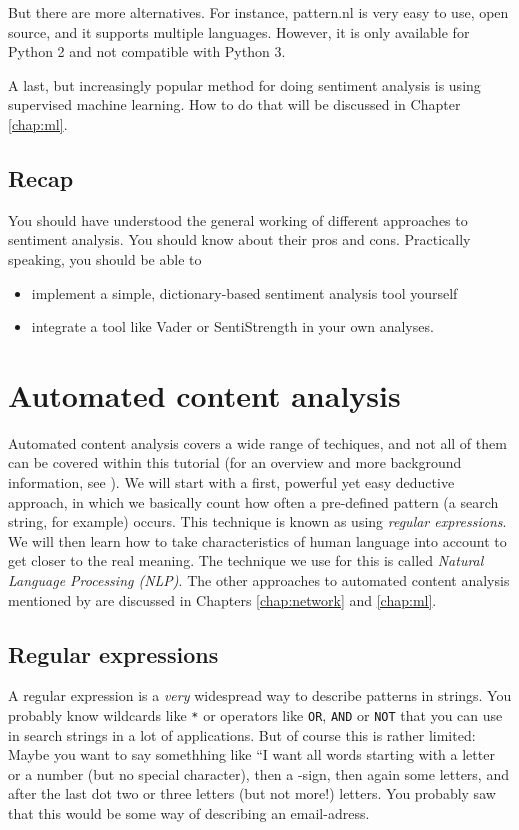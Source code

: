 \documentclass[a4paper,12pt]{book}
\begin{document}
But there are more alternatives. For instance, pattern.nl \citep{DeSmedt2012} is very easy to use, open source, and it supports multiple languages. However, it is only available for Python 2 and not compatible with Python 3.

A last, but increasingly popular method for doing sentiment analysis is using supervised machine learning. How to do that will be discussed in Chapter \ref{chap:ml}.


\section{Recap}
You should have understood the general working of different approaches to sentiment analysis. You should know about their pros and cons. Practically speaking, you should be able to
\begin{itemize}
	\item implement a simple, dictionary-based sentiment analysis tool yourself
	\item integrate a tool like Vader or SentiStrength in your own analyses.
\end{itemize}

\chapter{Automated content analysis}
Automated content analysis covers a wide range of techiques, and not all of them can be covered within this tutorial (for an overview and more background information, see \cite{Boumans2016}). We will start with a first, powerful yet easy deductive approach, in which we basically count how often a pre-defined pattern (a search string, for example) occurs. This technique is known as using \emph{regular expressions}. We will then learn how to take characteristics of human language into account to get closer to the real meaning. The technique we use for this is called \emph{Natural Language Processing (NLP)}.
The other approaches to automated content analysis mentioned by \cite{Boumans2016} are discussed in Chapters \ref{chap:network} and \ref{chap:ml}.


\section{Regular expressions}

A regular expression is a \emph{very} widespread way to describe patterns in strings. You probably know wildcards like {\tt{*}} or operators like {\tt{OR}}, {\tt{AND}} or {\tt{NOT}} that you can use in search strings in a lot of applications. But of course this is rather limited: Maybe you want to say somethhing like ``I want all words starting with a letter or a number (but no special character), then a \@-sign, then again some letters, and after the last dot two or three letters (but not more!) letters. You probably saw that this would be some way of describing an email-adress. 
\end{document}
